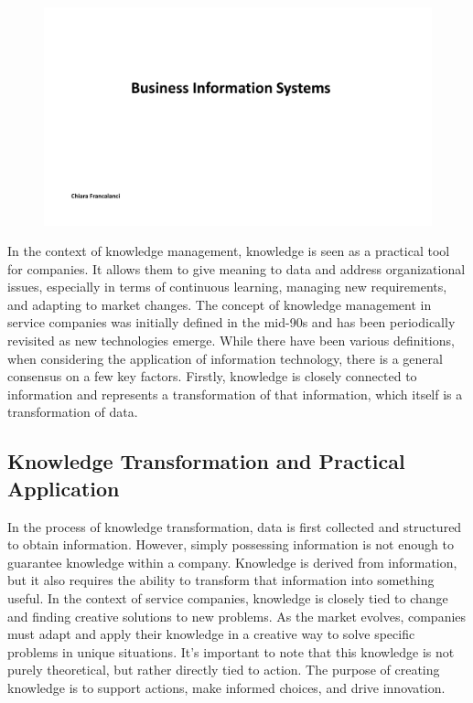 \begin{figure}[!h]
    \centering
    \includegraphics[page=4, trim = 1.5cm 4cm 1.5cm 4.5cm, clip, width=\textwidth]{images/05 - KM.pdf}
\end{figure}

In the context of knowledge management, knowledge is seen as a practical
tool for companies. It allows them to give meaning to data and address
organizational issues, especially in terms of continuous learning,
managing new requirements, and adapting to market changes. The concept
of knowledge management in service companies was initially defined in
the mid-90s and has been periodically revisited as new technologies
emerge. While there have been various definitions, when considering the
application of information technology, there is a general consensus on a
few key factors. Firstly, knowledge is closely connected to information
and represents a transformation of that information, which itself is a
transformation of data.

\subsection{Knowledge Transformation and Practical
    Application}\label{knowledge-transformation-and-practical-application}

In the process of knowledge transformation, data is first collected and
structured to obtain information. However, simply possessing information
is not enough to guarantee knowledge within a company. Knowledge is
derived from information, but it also requires the ability to transform
that information into something useful. In the context of service
companies, knowledge is closely tied to change and finding creative
solutions to new problems. As the market evolves, companies must adapt
and apply their knowledge in a creative way to solve specific problems
in unique situations. It's important to note that this knowledge is not
purely theoretical, but rather directly tied to action. The purpose of
creating knowledge is to support actions, make informed choices, and
drive innovation.

